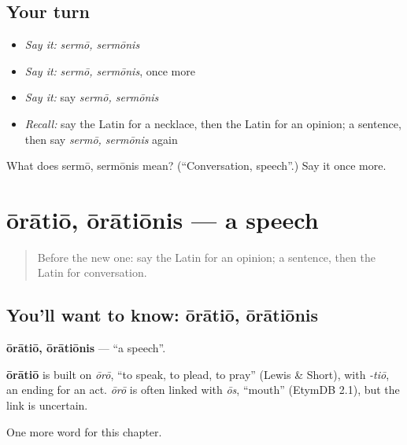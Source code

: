 \subsection*{Your turn}
\begin{itemize}
\raggedright
  \item \emph{Say it:} \emph{sermō, sermōnis}
  \item \emph{Say it:} \emph{sermō, sermōnis}, once more
  \item \emph{Say it:} say \emph{sermō, sermōnis}
  \item \emph{Recall:} say the Latin for a necklace, then the Latin for an opinion; a sentence, then say \emph{sermō, sermōnis} again
\end{itemize}

\begin{tcolorbox}[breakable,colback=teal!4,colframe=teal!35!black,title={Before you move on}]
What does sermō, sermōnis mean? (\textquotedblleft{}Conversation, speech\textquotedblright{}.) Say it once more.
\end{tcolorbox}
\section[ōrātiō, ōrātiōnis]{ōrātiō, ōrātiōnis — a speech}

\label{lesson:LA-C194-oratio}



\begin{quote}
Before the new one: say the Latin for an opinion; a sentence, then the Latin for conversation.
\end{quote}

\subsection*{You'll want to know: ōrātiō, ōrātiōnis}
\textbf{ōrātiō, ōrātiōnis} — \textquotedblleft{}a speech\textquotedblright{}.

\begin{cousinweb}
\textbf{ōrātiō} is built on \emph{ōrō}, \textquotedblleft{}to speak, to plead, to pray\textquotedblright{} (Lewis \& Short), with \emph{-tiō}, an ending for an act. \emph{ōrō} is often linked with \emph{ōs}, \textquotedblleft{}mouth\textquotedblright{} (EtymDB 2.1), but the link is uncertain.
\end{cousinweb}

\begin{grammarlens}[title={What you've built}]
One more word for this chapter.
\end{grammarlens}

